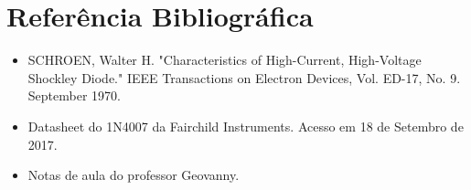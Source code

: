 \documentclass[12pt, a4paper, twoside]{article}
\begin{document}
\section{Referência Bibliográfica}

\begin{itemize}
    \item SCHROEN, Walter H. "Characteristics of High-Current, High-Voltage Shockley
    Diode." IEEE Transactions on Electron Devices, Vol. ED-17, No. 9. September 1970.
    \item Datasheet do 1N4007 da Fairchild Instruments. Acesso em 18 de Setembro de
    2017.
    \item Notas de aula do professor Geovanny.
\end{itemize}
\end{document}

